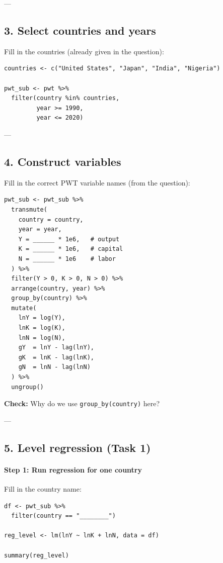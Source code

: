 \documentclass[12pt]{article}
\begin{document}
---

\subsection*{3. Select countries and years}

Fill in the countries (already given in the question):

\begin{verbatim}
countries <- c("United States", "Japan", "India", "Nigeria")

pwt_sub <- pwt %>%
  filter(country %in% countries,
         year >= 1990,
         year <= 2020)
\end{verbatim}

---

\subsection*{4. Construct variables}

Fill in the correct PWT variable names (from the question):

\begin{verbatim}
pwt_sub <- pwt_sub %>%
  transmute(
    country = country,
    year = year,
    Y = ______ * 1e6,   # output
    K = ______ * 1e6,   # capital
    N = ______ * 1e6    # labor
  ) %>%
  filter(Y > 0, K > 0, N > 0) %>%
  arrange(country, year) %>%
  group_by(country) %>%
  mutate(
    lnY = log(Y),
    lnK = log(K),
    lnN = log(N),
    gY  = lnY - lag(lnY),
    gK  = lnK - lag(lnK),
    gN  = lnN - lag(lnN)
  ) %>%
  ungroup()
\end{verbatim}

\textbf{Check:} Why do we use \texttt{group\_by(country)} here?

---

\subsection*{5. Level regression (Task 1)}

\paragraph{Step 1: Run regression for one country}

Fill in the country name:

\begin{verbatim}
df <- pwt_sub %>%
  filter(country == "________")

reg_level <- lm(lnY ~ lnK + lnN, data = df)

summary(reg_level)
\end{verbatim}
\end{document}
